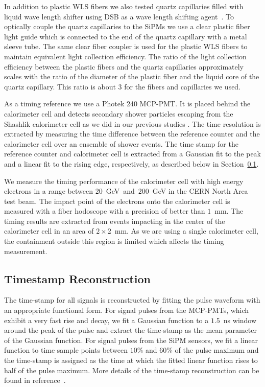 In addition to plastic WLS fibers we also tested quartz capillaries filled with
liquid wave length shifter using DSB as a wave length shifting
agent~\cite{capillaries}. To optically couple the quartz capillaries to the
SiPMs we use a clear plastic fiber light guide which is connected to the end of
the quartz capillary with a metal sleeve tube. The same clear fiber coupler is
used for the plastic WLS fibers to maintain equivalent light collection
efficiency. The ratio of the light collection efficiency between the plastic
fibers and the quartz capillaries approximately scales with the ratio of the
diameter of the plastic fiber and the liquid core of the quartz capillary. This
ratio is about $3$ for the fibers and capillaries we used.

As a timing reference we use a Photek 240 MCP-PMT. It is placed behind the
calorimeter cell and detects secondary shower particles escaping from the
Shashlik calorimeter cell as we did in our previous studies \cite{lysotiming}.
The time resolution is extracted by measuring the time difference between the
reference counter and the calorimeter cell over an ensemble of shower events.
The time stamp for the reference counter and calorimeter cell is extracted
from a Gaussian fit to the peak and a linear fit to the rising edge, 
respectively, as described below in Section~\ref{sec:reco}.

We measure the timing performance of the calorimeter cell with high energy
electrons in a range between $20$~GeV~and~$200$~GeV in the CERN North Area test
beam. The impact point of the electrons onto the calorimeter cell is measured
with a fiber hodoscope with a precision of better than $1$~mm. The timing
results are extracted from events impacting in the center of the calorimeter
cell in an area of $2\times2$~mm. As we are using a single calorimeter cell, the
containment outside this region is limited which affects the timing
measurement.

\subsection{Timestamp Reconstruction}
\label{sec:reco}
The time-stamp for all signals is reconstructed by fitting the pulse waveform
with an appropriate functional form. For signal pulses from the MCP-PMTs, which
exhibit a very fast rise and decay, we fit a Gaussian function to a $1.5$~ns
window around the peak of the pulse and extract the time-stamp as the mean
parameter of the Gaussian function. For signal pulses from the SiPM sensors, we
fit a linear function to time sample points between $10\%$ and $60\%$ of the
pulse maximum and the time-stamp is assigned as the time at which the fitted
linear function rises to half of the pulse maximum. More details of the
time-stamp reconstruction can be found in reference~\cite{Anderson:2015gha}.
